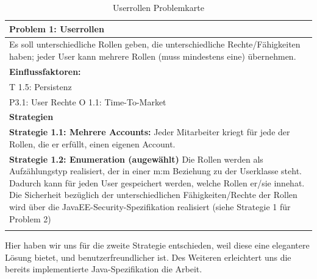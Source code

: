 \documentclass[enabledeprecatedfontcommands,fontsize=12pt,paper=a4,twoside]{scrartcl}
\begin{document}
\begin{table}[H]
    \centering
    \begin{tabular}{|p{15cm}|}
    \hline
          \textbf{Problem 1:} Userrollen \\ \hline
          Es soll unterschiedliche Rollen geben, die unterschiedliche Rechte/Fähigkeiten haben; jeder User kann mehrere Rollen (muss mindestens eine) übernehmen. \\ \hline
          \textbf{Einflussfaktoren: } \\
          T 1.5: Persistenz \\
          P3.1: User Rechte
          O 1.1: Time-To-Market \\
          \hline
          \textbf{Strategien} \\ \hline
            {}          
           \label{strategie:1.1}     
          \textbf{Strategie 1.1: Mehrere Accounts:} Jeder Mitarbeiter kriegt für jede der Rollen, die er erfüllt, einen eigenen Account. \\        
  {}          
           \label{strategie:1.2}              
          \textbf{Strategie 1.2: Enumeration (augewählt)} Die Rollen werden als Aufzählungstyp realisiert, der in einer m:m Beziehung zu der Userklasse steht. Dadurch kann für jeden User gespeichert werden, welche Rollen er/sie innehat. Die Sicherheit bezüglich der unterschiedlichen Fähigkeiten/Rechte der Rollen wird über die JavaEE-Security-Spezifikation realisiert (siehe Strategie 1 für Problem 2)\\
	 \\ \hline
    \end{tabular}

    \caption{Userrollen Problemkarte}
    \label{tab:ProblemKarte1}
\end{table}
Hier haben wir uns für die zweite Strategie entschieden, weil diese eine elegantere Lösung bietet, und benutzerfreundlicher ist. Des Weiteren erleichtert uns die bereits implementierte Java-Spezifikation die Arbeit. \\
\end{document}
